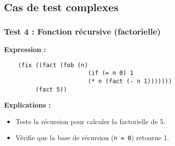 \documentclass{article}
\begin{document}
\subsection{Cas de test complexes}
\subsubsection*{Test 4 : Fonction récursive (factorielle)} 
\hspace{.5cm}\textbf{Expression :} 
\begin{verbatim} 
    (fix ((fact (fob (n) 
                        (if (= n 0) 1 
                        (* n (fact (- n 1))))))) 
         (fact 5)) 
\end{verbatim} 
\hspace{.5cm}\textbf{Explications :} 
\begin{itemize} 
    \item Teste la récursion pour calculer la factorielle de 5. 
    \item Vérifie que la base de récursion (\texttt{n = 0}) retourne 1. 
\end{itemize}
\end{document}
